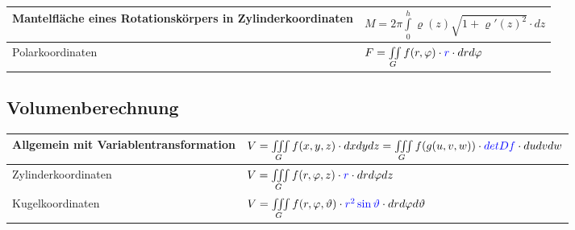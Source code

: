 \begin{tabular}{|p{5.5 cm}|p{10cm}|}
\begin{minipage}{5.5cm}
  		Mantelfläche eines Rotationskörpers in Zylinderkoordinaten    
    \end{minipage}&
	\begin{minipage}{10cm}
    	\vspace{0.1cm}
		$M = 2\pi\int\limits_0^h\varrho(z)\sqrt{1+\varrho'(z)^2}\cdot dz$
    	\vspace{0.1cm}
    \end{minipage}\\
	\hline
	Polarkoordinaten &
	\begin{minipage}{10cm}
    	\vspace{0.1cm}
		$F=\iint\limits_G f(r,\varphi)\cdot \textcolor{blue}{r} \cdot dr d\varphi $
    	\vspace{0.1cm}
    \end{minipage}\\
	\hline
\end{tabular}

\subsection{Volumenberechnung}
\begin{tabular}{|p{6 cm}|p{10cm}|}
	\hline
	Allgemein mit Variablentransformation &
	\begin{minipage}{10cm}
    	\vspace{0.1cm}
		$V=\iiint\limits_G f(x,y,z)\cdot dxdydz=\iiint\limits_G f(g(u,v,w))\cdot
		\textcolor{blue}{detDf}\cdot dudvdw$
    	\vspace{0.1cm}
    \end{minipage}\\
	\hline
	Zylinderkoordinaten &
	\begin{minipage}{10cm}
    	\vspace{0.1cm}
		$V=\iiint\limits_G f(r,\varphi,z)\cdot \textcolor{blue}{r} \cdot
		dr d\varphi dz$
    	\vspace{0.1cm}
    \end{minipage}\\
	\hline
	Kugelkoordinaten &
	\begin{minipage}{10cm}
    	\vspace{0.1cm}
		$V=\iiint\limits_G f(r,\varphi,\vartheta)\cdot \textcolor{blue}{r^2
		\sin\vartheta} \cdot dr d\varphi d\vartheta$
    	\vspace{0.1cm}
    \end{minipage}\\
	\hline	
\end{tabular}

